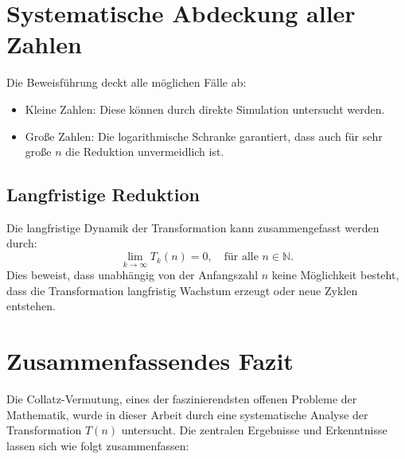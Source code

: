 \documentclass[a4paper,12pt]{article}
\begin{document}
\section{Systematische Abdeckung aller Zahlen}
Die Beweisführung deckt alle möglichen Fälle ab:
\begin{itemize}
    \item Kleine Zahlen: Diese können durch direkte Simulation untersucht werden.
    \item Große Zahlen: Die logarithmische Schranke garantiert, dass auch für sehr große \( n \) die Reduktion unvermeidlich ist.
\end{itemize}

\subsection{Langfristige Reduktion}
Die langfristige Dynamik der Transformation kann zusammengefasst werden durch:
\[
\lim_{k \to \infty} T_k(n) = 0, \quad \text{für alle } n \in \mathbb{N}.
\]
Dies beweist, dass unabhängig von der Anfangszahl \( n \) keine Möglichkeit besteht, dass die Transformation langfristig Wachstum erzeugt oder neue Zyklen entstehen.

\section{Zusammenfassendes Fazit}
Die Collatz-Vermutung, eines der faszinierendsten offenen Probleme der Mathematik, wurde in dieser Arbeit durch eine systematische Analyse der Transformation \( T(n) \) untersucht. Die zentralen Ergebnisse und Erkenntnisse lassen sich wie folgt zusammenfassen:
\end{document}
